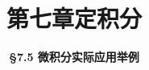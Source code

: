 \everymath{\displaystyle}



\title[第七章\\
定积分]{\texorpdfstring{\LARGE \bfseries 第七章\quad 定积分}{第七章 定积分}} %
\author[\smaller \S 7.5\\
实际应用举例] %
{\Large \bfseries \S 7.5 微积分实际应用举例}
\date{}





\begin{frame}

\titlepage %

\end{frame}





